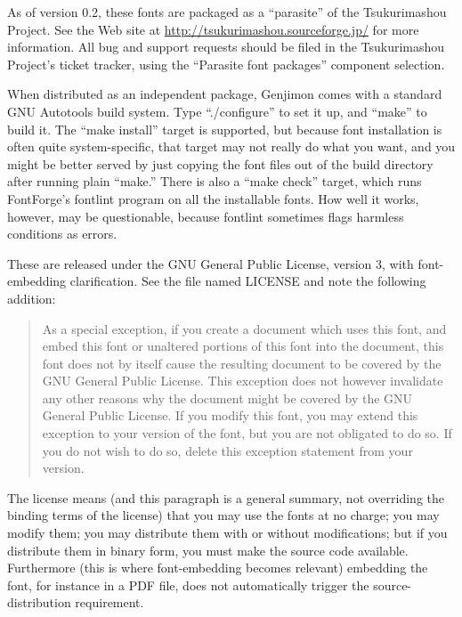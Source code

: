 \documentclass[12pt]{article}
\begin{document}
As of version 0.2, these fonts are packaged as a ``parasite'' of the
Tsukurimashou Project.  See the Web site at
\url{http://tsukurimashou.sourceforge.jp/} for more information.  All bug
and support requests should be filed in the Tsukurimashou Project's ticket
tracker, using the ``Parasite font packages'' component selection.

When distributed as an independent package, Genjimon comes with a standard
GNU Autotools build system.  Type ``./configure'' to set it up, and ``make''
to build it.  The ``make install'' target is supported, but because font
installation is often quite system-specific, that target may not really do
what you want, and you might be better served by just copying the font files
out of the build directory after running plain ``make.''  There is also a
``make check'' target, which runs FontForge's fontlint program on all the
installable fonts.  How well it works, however, may be questionable, because
fontlint sometimes flags harmless conditions as errors.

These are released under the GNU General Public License, version 3, with
font-embedding clarification.  See the file named LICENSE and note the
following addition:

\begin{quotation}
As a special exception, if you create a document which uses this font, and
embed this font or unaltered portions of this font into the document, this
font does not by itself cause the resulting document to be covered by the
GNU General Public License. This exception does not however invalidate any
other reasons why the document might be covered by the GNU General Public
License. If you modify this font, you may extend this exception to your
version of the font, but you are not obligated to do so. If you do not wish
to do so, delete this exception statement from your version.
\end{quotation}

The license means (and this paragraph is a general summary, not overriding
the binding terms of the license) that you may use the fonts at no charge;
you may modify them; you may distribute them with or without modifications;
but if you distribute them in binary form, you must make the source code
available.  Furthermore (this is where font-embedding becomes relevant)
embedding the font, for instance in a PDF file, does not automatically
trigger the source-distribution requirement.
\end{document}
